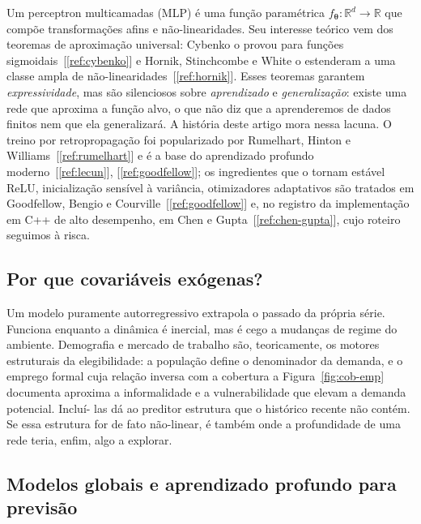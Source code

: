 \documentclass[12pt,a4paper,oneside]{article}
\newcommand{\C}[1]{[\ref{#1}]}
\begin{document}
Um perceptron multicamadas (MLP) é uma função paramétrica
$f_{\bm\theta}:\mathbb{R}^{d}\to\mathbb{R}$ que compõe transformações
afins e não-linearidades. Seu interesse teórico vem dos teoremas de
aproximação universal: Cybenko o provou para funções
sigmoidais~\C{ref:cybenko} e Hornik, Stinchcombe e White o estenderam a
uma classe ampla de não-linearidades~\C{ref:hornik}. Esses teoremas
garantem \emph{expressividade}, mas são silenciosos sobre
\emph{aprendizado} e \emph{generalização}: existe uma rede que aproxima a
função alvo, o que não diz que a aprenderemos de dados finitos nem que ela
generalizará. A história deste artigo mora nessa lacuna. O treino por
retropropagação foi popularizado por Rumelhart, Hinton e
Williams~\C{ref:rumelhart} e é a base do aprendizado profundo
moderno~\C{ref:lecun}, \C{ref:goodfellow}; os ingredientes que o tornam
estável \textemdash{} ReLU, inicialização sensível à variância,
otimizadores adaptativos \textemdash{} são tratados em
Goodfellow, Bengio e Courville~\C{ref:goodfellow} e, no registro da
implementação em C++ de alto desempenho, em Chen e
Gupta~\C{ref:chen-gupta}, cujo roteiro seguimos à risca.

\subsection{Por que covariáveis exógenas?}

Um modelo puramente autorregressivo extrapola o passado da própria série.
Funciona enquanto a dinâmica é inercial, mas é cego a mudanças de regime
do ambiente. Demografia e mercado de trabalho são, teoricamente, os
motores estruturais da elegibilidade: a população define o denominador da
demanda, e o emprego formal \textemdash{} cuja relação inversa com a
cobertura a Figura~\ref{fig:cob-emp} documenta \textemdash{} aproxima a
informalidade e a vulnerabilidade que elevam a demanda potencial. Incluí-
las dá ao preditor estrutura que o histórico recente não contém. Se essa
estrutura for de fato não-linear, é também onde a profundidade de uma
rede teria, enfim, algo a explorar.

\subsection{Modelos globais e aprendizado profundo para previsão}
\end{document}
